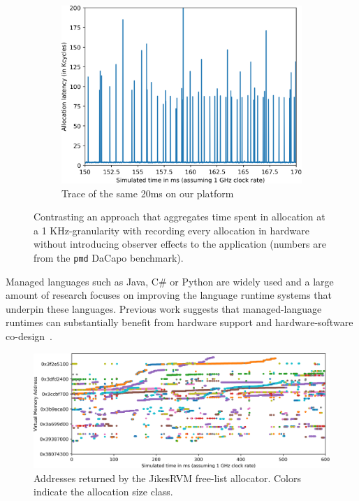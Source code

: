 \begin{figure}
\begin{subfigure}[t]{0.32\textwidth}
		\includegraphics[width=\textwidth]{results/java-alloc-detailed.png}
		\caption{Trace of the same 20ms on our platform}
	\end{subfigure}
	\caption{Contrasting an approach that aggregates time spent in allocation at a 1 KHz-granularity with recording every allocation in hardware without introducing observer effects to the application (numbers are from the \texttt{pmd} DaCapo benchmark).}
	\label{fig:java_alloc}
\end{figure}

Managed languages such as Java, C\# or Python are widely used and a large
amount of research focuses on improving the language runtime systems that
underpin these languages. Previous work suggests that managed-language runtimes
can substantially benefit from hardware support and hardware-software
co-design~\cite{Click:2005:PGA:1064979.1064988,Wright:2005:OMA:1698178,Ungar:1984:ASS:800015.808182,Joao:2009:FRH:1555754.1555806}.


\begin{figure}[t]
		\centering
		\includegraphics[width=\columnwidth]{results/heatmap.png}
		\caption{Addresses returned by the JikesRVM free-list allocator. Colors indicate the allocation size class.}
		\label{fig:java_alloc_heatmap}
\end{figure}


